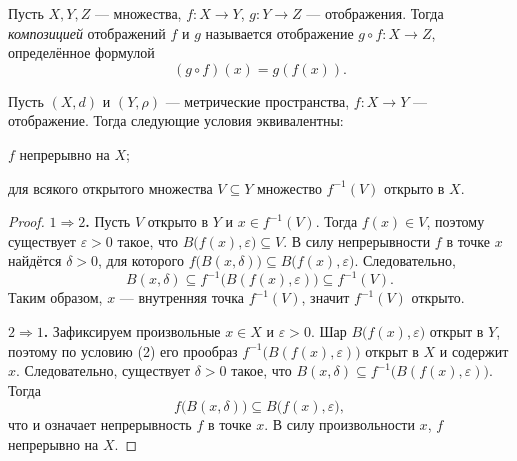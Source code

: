 


\begin{defn}
    Пусть $X, Y, Z$ --- множества, $f : X \to Y$, $g : Y \to Z$ --- отображения. Тогда \textit{композицией} отображений $f$ и $g$ называется отображение $g \circ f : X \to Z$, определённое формулой
    \[
        (g \circ f)(x) = g(f(x)).
    \]
\end{defn}

\begin{theorem}
    Пусть $(X, d)$ и $(Y, \rho)$ --- метрические пространства, $f : X \to Y$ --- отображение. Тогда следующие условия эквивалентны:
    \begin{enum}
        \item $f$ непрерывно на $X$;
        \item для всякого открытого множества $V \subseteq Y$ множество $f^{-1}(V)$ открыто в $X$.
    \end{enum}
    \begin{proof}
        \textbf{$1 \Rightarrow 2$.} Пусть $V$ открыто в $Y$ и $x \in f^{-1}(V)$. Тогда $f(x) \in V$, поэтому существует $\varepsilon > 0$ такое, что $B\bigl(f(x), \varepsilon\bigr) \subseteq V$. В силу непрерывности $f$ в точке $x$ найдётся $\delta > 0$, для которого $f\bigl(B(x, \delta)\bigr) \subseteq B\bigl(f(x), \varepsilon\bigr)$. Следовательно,
        \[
            B(x, \delta) \subseteq f^{-1}\!\bigl(B(f(x), \varepsilon)\bigr) \subseteq f^{-1}(V).
        \]
        Таким образом, $x$ --- внутренняя точка $f^{-1}(V)$, значит $f^{-1}(V)$ открыто.

        \textbf{$2 \Rightarrow 1$.} Зафиксируем произвольные $x \in X$ и $\varepsilon > 0$. Шар $B\bigl(f(x), \varepsilon\bigr)$ открыт в $Y$, поэтому по условию (2) его прообраз $f^{-1}\!\bigl(B(f(x), \varepsilon)\bigr)$ открыт в $X$ и содержит $x$. Следовательно, существует $\delta > 0$ такое, что $B(x, \delta) \subseteq f^{-1}\!\bigl(B(f(x), \varepsilon)\bigr)$. Тогда
        \[
            f\bigl(B(x, \delta)\bigr) \subseteq B\bigl(f(x), \varepsilon\bigr),
        \]
        что и означает непрерывность $f$ в точке $x$. В силу произвольности $x$, $f$ непрерывно на $X$. \qedhere
    \end{proof}
\end{theorem}


